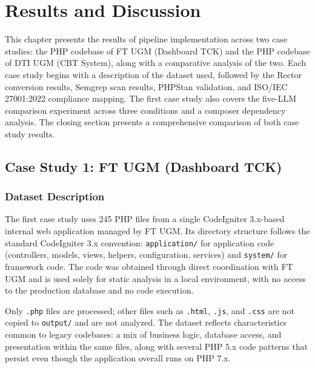 
\chapter{Results and Discussion}

This chapter presents the results of pipeline implementation across two case studies: the PHP codebase of FT UGM (Dashboard TCK) and the PHP codebase of DTI UGM (CBT System), along with a comparative analysis of the two. Each case study begins with a description of the dataset used, followed by the Rector conversion results, Semgrep scan results, PHPStan validation, and ISO/IEC 27001:2022 compliance mapping. The first case study also covers the five-LLM comparison experiment across three conditions and a composer dependency analysis. The closing section presents a comprehensive comparison of both case study results.

\section{Case Study 1: FT UGM (Dashboard TCK)}

\subsection{Dataset Description}

The first case study uses 245 PHP files from a single CodeIgniter 3.x-based internal web application managed by FT UGM. Its directory structure follows the standard CodeIgniter 3.x convention: \texttt{application/} for application code (controllers, models, views, helpers, configuration, services) and \texttt{system/} for framework code. The code was obtained through direct coordination with FT UGM and is used solely for static analysis in a local environment, with no access to the production database and no code execution.

Only \texttt{.php} files are processed; other files such as \texttt{.html}, \texttt{.js}, and \texttt{.css} are not copied to \texttt{output/} and are not analyzed. The dataset reflects characteristics common to legacy codebases: a mix of business logic, database access, and presentation within the same files, along with several PHP 5.x code patterns that persist even though the application overall runs on PHP 7.x.

